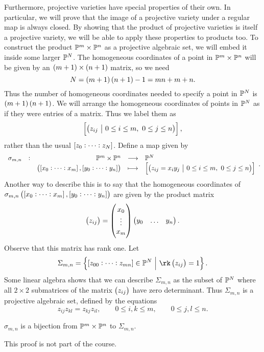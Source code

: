 Furthermore, projective varieties have special properties of their own. In particular, we will prove that the image of a projective variety under a regular map is always closed. By showing that the product of projective varieties is itself a projective variety, we will be able to apply these properties to products too. To construct the product $ \mathbb{P}^m \times \mathbb{P}^n $ as a projective algebraic set, we will embed it inside some larger $ \mathbb{P}^N $. The homogeneous coordinates of a point in $ \mathbb{P}^m \times \mathbb{P}^n $ will be given by an $ \br{m + 1} \times \br{n + 1} $ matrix, so we need
$$ N = \br{m + 1}\br{n + 1} - 1 = mn + m + n. $$
Thus the number of homogeneous coordinates needed to specify a point in $ \mathbb{P}^N $ is $ \br{m + 1}\br{n + 1} $. We will arrange the homogeneous coordinates of points in $ \mathbb{P}^N $ as if they were entries of a matrix. Thus we label them as
$$ \sbr{\br{z_{ij} \st 0 \le i \le m, \ 0 \le j \le n}}, $$
rather than the usual $ \sbr{z_0 : \dots : z_N} $. Define a map given by
$$ \function[\sigma_{m, n}]{\PP^m \times \PP^n}{\PP^N}{\br{\sbr{x_0 : \dots : x_m}, \sbr{y_0 : \dots : y_n}}}{\sbr{\br{z_{ij} = x_iy_j \st 0 \le i \le m, \ 0 \le j \le n}}}. $$
Another way to describe this is to say that the homogeneous coordinates of $ \sigma_{m, n}\br{\sbr{x_0 : \dots : x_m}, \sbr{y_0 : \dots : y_n}} $ are given by the product matrix
$$ \br{z_{ij}} = \threebyone{x_0}{\vdots}{x_m}\onebythree{y_0}{\dots}{y_n}. $$
Observe that this matrix has rank one. Let
$$ \Sigma_{m, n} = \cbr{\sbr{z_{00} : \dots : z_{mn}} \in \PP^N \st \rk \br{z_{ij}} = 1}. $$
Some linear algebra shows that we can describe $ \Sigma_{m, n} $ as the subset of $ \mathbb{P}^N $ where all $ 2 \times 2 $ submatrices of the matrix $ \br{z_{ij}} $ have zero determinant. Thus $ \Sigma_{m, n} $ is a projective algebraic set, defined by the equations
$$ z_{ij}z_{kl} = z_{kj}z_{il}, \qquad 0 \le i, k \le m, \qquad 0 \le j, l \le n. $$

\begin{lemma}
$ \sigma_{m, n} $ is a bijection from $ \mathbb{P}^m \times \mathbb{P}^n $ to $ \Sigma_{m, n} $.
\end{lemma}

This proof is not part of the course.

